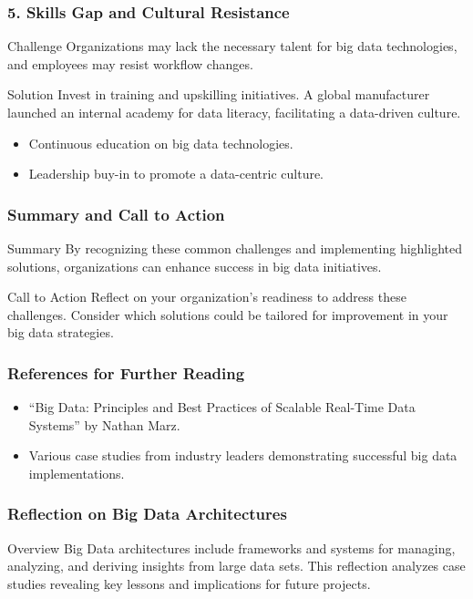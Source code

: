 \documentclass[aspectratio=169]{beamer}
\begin{document}
\begin{frame}[fragile]
    \frametitle{5. Skills Gap and Cultural Resistance}
    \begin{block}{Challenge}
        Organizations may lack the necessary talent for big data technologies, and employees may resist workflow changes.
    \end{block}
    
    \begin{block}{Solution}
        Invest in training and upskilling initiatives.
        A global manufacturer launched an internal academy for data literacy, facilitating a data-driven culture.
    \end{block}
    
    \begin{itemize}
        \item Continuous education on big data technologies.
        \item Leadership buy-in to promote a data-centric culture.
    \end{itemize}
\end{frame}

\begin{frame}[fragile]
    \frametitle{Summary and Call to Action}
    \begin{block}{Summary}
        By recognizing these common challenges and implementing highlighted solutions, organizations can enhance success in big data initiatives.
    \end{block}
    
    \begin{block}{Call to Action}
        Reflect on your organization’s readiness to address these challenges. Consider which solutions could be tailored for improvement in your big data strategies.
    \end{block}
\end{frame}

\begin{frame}[fragile]
    \frametitle{References for Further Reading}
    \begin{itemize}
        \item “Big Data: Principles and Best Practices of Scalable Real-Time Data Systems” by Nathan Marz.
        \item Various case studies from industry leaders demonstrating successful big data implementations.
    \end{itemize}
\end{frame}

\begin{frame}[fragile]
    \frametitle{Reflection on Big Data Architectures}
    \begin{block}{Overview}
        Big Data architectures include frameworks and systems for managing, analyzing, and deriving insights from large data sets. This reflection analyzes case studies revealing key lessons and implications for future projects.
    \end{block}
\end{frame}
\end{document}
